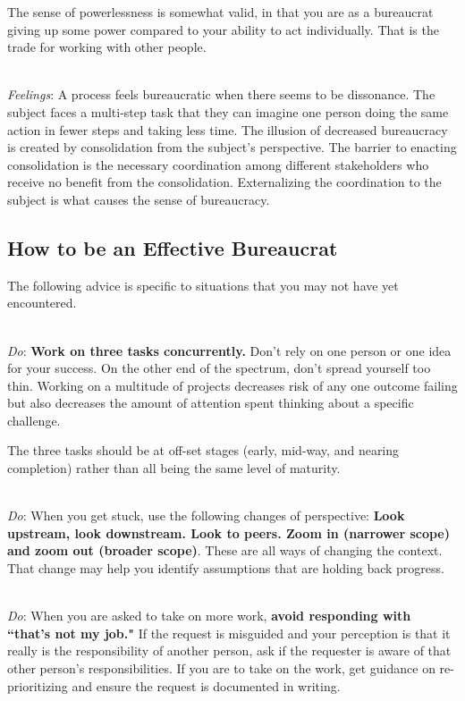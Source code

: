 The sense of powerlessness is somewhat valid, in that you are as a bureaucrat giving up some power compared to your ability to act individually. That is the trade for working with other people.

\ \\
\textit{Feelings}: A process feels bureaucratic when there seems to be dissonance. The subject faces a multi-step task that they can imagine one person doing the same action in fewer steps and taking less time. The illusion of decreased bureaucracy is created by consolidation from the subject's perspective. The barrier to enacting consolidation is the necessary coordination among different stakeholders who receive no benefit from the consolidation. Externalizing the coordination to the subject is what causes the sense of bureaucracy. 

\subsection*{How to be an Effective Bureaucrat}

The following advice is specific to situations that you may not have yet encountered. 

\ \\
\textit{Do}: \textbf{Work on three tasks concurrently.} Don't rely on one person or one idea for your success. On the other end of the spectrum, don't spread yourself too thin.
Working on a multitude of projects decreases risk of any one outcome failing but also decreases the amount of attention spent thinking about a specific challenge. 

The three tasks should be at off-set stages (early, mid-way, and nearing completion) rather than all being the same level of maturity.

\ \\
\textit{Do}: When you get stuck, use the following changes of perspective:  
\textbf{Look upstream, look downstream. Look to peers. Zoom in (narrower scope) and zoom out (broader scope)}. These are all ways of changing the context. That change may help you identify assumptions that are holding back progress.

\ \\
\textit{Do}: When you are asked to take on more work, \textbf{avoid responding with ``that's not my job."} If the request is misguided and your perception is that it really is the responsibility of another person, ask if the requester is aware of that other person's responsibilities. If you are to  take on the work, get guidance on re-prioritizing and ensure the request is documented in writing. 

